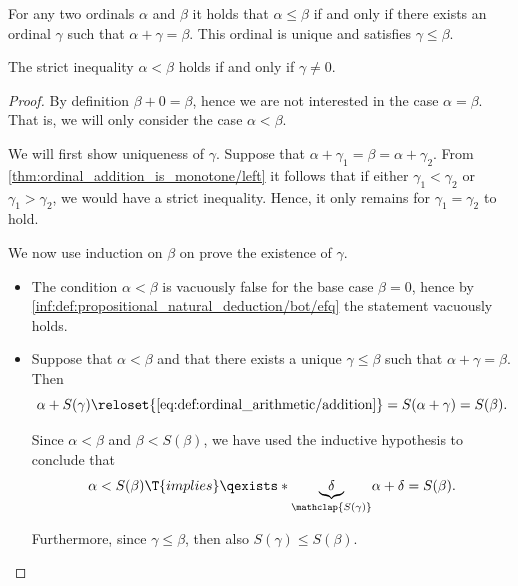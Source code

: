 \begin{proposition}\label{thm:ordinal_ordering_is_well_ordering_via_addition}
  For any two ordinals \( \alpha \) and \( \beta \) it holds that \( \alpha \leq \beta \) if and only if there exists an ordinal \( \gamma \) such that \( \alpha + \gamma = \beta \). This ordinal is unique and satisfies \( \gamma \leq \beta \).

  The strict inequality \( \alpha < \beta \) holds if and only if \( \gamma \neq 0 \).
\end{proposition}
\begin{proof}
  \SufficiencySubProof By definition \( \beta + 0 = \beta \), hence we are not interested in the case \( \alpha = \beta \). That is, we will only consider the case \( \alpha < \beta \).

  We will first show uniqueness of \( \gamma \). Suppose that \( \alpha + \gamma_1 = \beta = \alpha + \gamma_2 \). From \eqref{thm:ordinal_addition_is_monotone/left} it follows that if either \( \gamma_1 < \gamma_2 \) or \( \gamma_1 > \gamma_2 \), we would have a strict inequality. Hence, it only remains for \( \gamma_1 = \gamma_2 \) to hold.

  We now use induction on \( \beta \) on prove the existence of \( \gamma \).
  \begin{itemize}
    \item The condition \( \alpha < \beta \) is vacuously false for the base case \( \beta = 0 \), hence by \ref{inf:def:propositional_natural_deduction/bot/efq} the statement vacuously holds.

    \item Suppose that \( \alpha < \beta \) and that there exists a unique \( \gamma \leq \beta \) such that \( \alpha + \gamma = \beta \). Then
    \begin{equation*}
      \alpha + S(\gamma)
      \reloset {\eqref{eq:def:ordinal_arithmetic/addition}} =
      S(\alpha + \gamma)
      =
      S(\beta).
    \end{equation*}

    Since \( \alpha < \beta \) and \( \beta < S(\beta) \), we have used the inductive hypothesis to conclude that
    \begin{equation*}
      \alpha < S(\beta) \T{implies} \qexists* {\underbrace{\delta}_{\mathclap{S(\gamma)}}} \alpha + \delta = S(\beta).
    \end{equation*}

    Furthermore, since \( \gamma \leq \beta \), then also \( S(\gamma) \leq S(\beta) \).


\end{itemize}
\end{proof}
